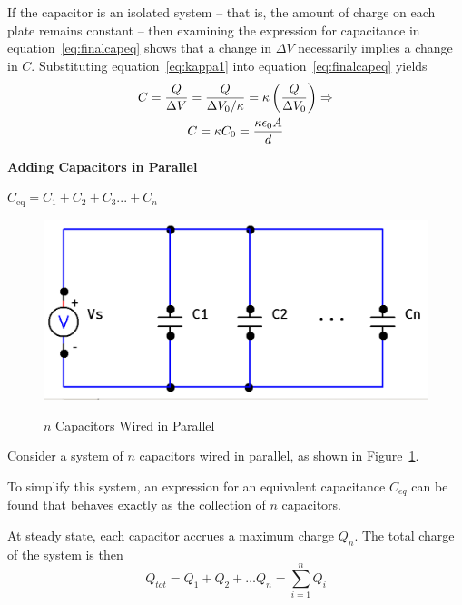 \documentclass[twocolumn,english]{IEEEtran}
\theoremstyle{plain}
\theoremstyle{plain}
\begin{document}
\begin{enumerate}
If the capacitor is an isolated system -- that is, the amount of charge on each plate remains constant -- then examining the expression for capacitance in equation~\ref{eq:finalcapeq} shows that a change in $\Delta V$ necessarily implies a change in $C$. Substituting equation~\ref{eq:kappa1} into equation~\ref{eq:finalcapeq} yields
\begin{gather}\label{eq:kappa}
  C = \frac{Q}{\Delta V} = \frac{Q}{\Delta V_0 / \kappa} = \kappa \left(\frac{Q}{\Delta V_0}\right) \Rightarrow \notag \\
  C = \kappa C_0 = \frac{\kappa \epsilon_0 A}{d}
\end{gather}
\end{enumerate}

\noindent \hrulefill

\noindent \textbf{Adding Capacitors in Parallel}

\noindent$C_{\text{eq}}=C_1+C_2+C_3...+C_n$

  \begin{figure}[h!]
  \begin{centering}
  \begin{center}
  \includegraphics[width=\linewidth]{./Pictures/parallelc.png}
  \label{fig:parallel_diagram}
  \caption{$n$ Capacitors Wired in Parallel}
  \end{center}
  \par\end{centering}
  \end{figure}

  Consider a system of $n$ capacitors wired in parallel, as shown in Figure~\ref{fig:parallel_diagram}.

  To simplify this system, an expression for an equivalent capacitance $C_{eq}$ can be found that behaves exactly as the collection of $n$ capacitors.

  At steady state, each capacitor accrues a maximum charge $Q_n$. The total charge of the system is then
  \begin{equation}\label{eq:qdots}
  Q_{tot} = Q_1 + Q_2 + \dots Q_n = \sum_{i=1}^{n} Q_i
  \end{equation}
\end{document}

